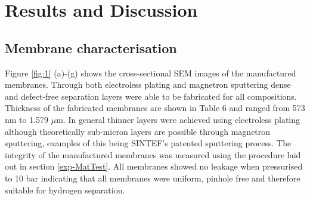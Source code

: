\section{Results and Discussion}
\subsection{Membrane characterisation}


Figure \ref{fig:1} (a)-(g) shows the cross-sectional SEM images of the manufactured membranes. Through both electroless plating and magnetron sputtering dense and defect-free separation layers were able to be fabricated for all compositions. Thickness of the fabricated membranes are shown in Table 6 and ranged from 573 nm to 1.579 $\mu$m. In general thinner layers were achieved using electroless plating although theoretically sub-micron layers are possible through magnetron sputtering, examples of this being SINTEF’s patented sputtering process.\cite{Peters2011} The integrity of the manufactured membranes was measured using the procedure laid out in section \ref{exp-MatTest}. All membranes showed no leakage when pressurised to 10 bar indicating that all membranes were uniform, pinhole free and therefore suitable for hydrogen separation. \cite{GouveiaGil2015}


